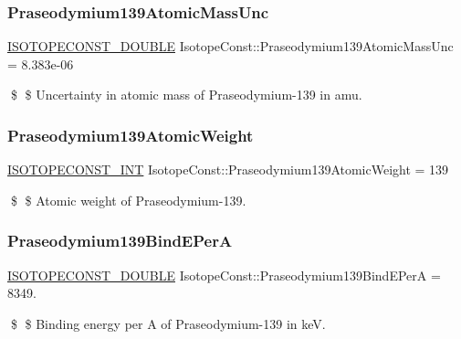 \subsubsection{\texorpdfstring{Praseodymium139\+Atomic\+Mass\+Unc}{Praseodymium139AtomicMassUnc}}
{\footnotesize\ttfamily \mbox{\hyperlink{group___isotope_const-_macros_ga8f45a7272ce02c0b4c65c44636ed719a}{I\+S\+O\+T\+O\+P\+E\+C\+O\+N\+S\+T\+\_\+\+D\+O\+U\+B\+LE}} Isotope\+Const\+::\+Praseodymium139\+Atomic\+Mass\+Unc = 8.\+383e-\/06}

\$ \$ Uncertainty in atomic mass of Praseodymium-\/139 in amu. \mbox{\label{group___isotope_const-_praseodymium-_pr139_gaae0594f3c9601ec75b3d0da1b0f5ea44}} 
\subsubsection{\texorpdfstring{Praseodymium139\+Atomic\+Weight}{Praseodymium139AtomicWeight}}
{\footnotesize\ttfamily \mbox{\hyperlink{group___isotope_const-_macros_ga5f18360b3e99483a35c32d789e62621c}{I\+S\+O\+T\+O\+P\+E\+C\+O\+N\+S\+T\+\_\+\+I\+NT}} Isotope\+Const\+::\+Praseodymium139\+Atomic\+Weight = 139}

\$ \$ Atomic weight of Praseodymium-\/139. \mbox{\label{group___isotope_const-_praseodymium-_pr139_ga1ad2af1c3d3e0ddf4cc6dc222150422c}} 
\subsubsection{\texorpdfstring{Praseodymium139\+Bind\+E\+PerA}{Praseodymium139BindEPerA}}
{\footnotesize\ttfamily \mbox{\hyperlink{group___isotope_const-_macros_ga8f45a7272ce02c0b4c65c44636ed719a}{I\+S\+O\+T\+O\+P\+E\+C\+O\+N\+S\+T\+\_\+\+D\+O\+U\+B\+LE}} Isotope\+Const\+::\+Praseodymium139\+Bind\+E\+PerA = 8349.}

\$ \$ Binding energy per A of Praseodymium-\/139 in keV. \mbox{\label{group___isotope_const-_praseodymium-_pr139_ga1b32417f16a3b77ee866d5d83477943c}} 
